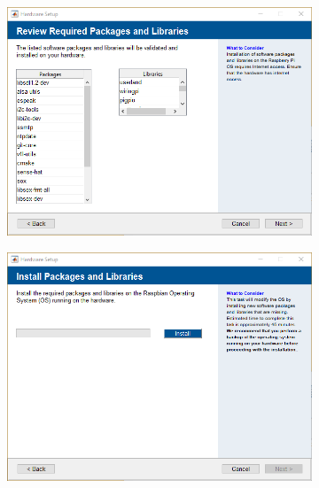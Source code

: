 \begin{figure}[ht]
\begin{subfigure}{.3\textwidth}
		\caption{}
		\label{fig:sub-second}
	\end{subfigure}
	\begin{subfigure}{.3\textwidth}
		\centering
		\includegraphics[width=.9\linewidth]{Pictures/Connect RPi 04.png}  
		\caption{}
		\label{fig:sub-third}
	\end{subfigure}
	\newline
	\begin{subfigure}{.3\textwidth}
		\centering
		\includegraphics[width=.9\linewidth]{Pictures/Connect RPi 05.png}  
		\caption{}
		\label{fig:sub-fourth}
	\end{subfigure}
	\begin{subfigure}{.3\textwidth}
		\centering

\end{subfigure}
\end{figure}
